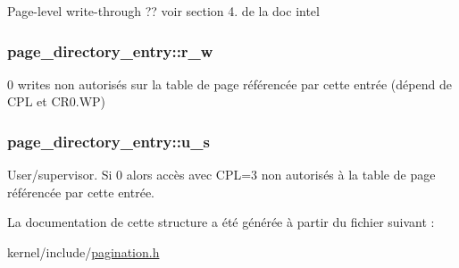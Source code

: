 Page-\/level write-\/through ?? voir section 4. de la doc intel \hypertarget{structpage__directory__entry_af4aa8287c5da23728d33053fcb3f1715}{
\subsubsection[{r\+\_\+w}]{ page\+\_\+directory\+\_\+entry\+::r\+\_\+w}}\label{structpage__directory__entry_af4aa8287c5da23728d33053fcb3f1715}
0 writes non autorisés sur la table de page référencée par cette entrée (dépend de C\+P\+L et C\+R0.\+W\+P) \hypertarget{structpage__directory__entry_a6e87e7efc2fbbbd5f8f7fd2e0cd09b3f}{
\subsubsection[{u\+\_\+s}]{ page\+\_\+directory\+\_\+entry\+::u\+\_\+s}}\label{structpage__directory__entry_a6e87e7efc2fbbbd5f8f7fd2e0cd09b3f}
User/supervisor. Si 0 alors accès avec C\+P\+L=3 non autorisés à la table de page référencée par cette entrée. 

La documentation de cette structure a été générée à partir du fichier suivant \+:\begin{DoxyCompactItemize}
\item 
kernel/include/\hyperlink{pagination_8h}{pagination.\+h}\end{DoxyCompactItemize}

